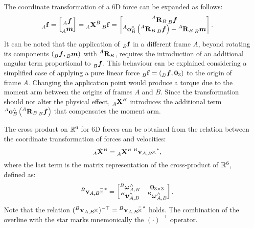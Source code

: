 \begin{remark*}
%
The coordinate transformation of a 6D force can be expanded as follows:
%
\begin{equation*}
    \forcesix[A]
    = \begin{bmatrix}
        \forcelin[A] \\ \forceang[A]
    \end{bmatrix}
    = \transfor[A]^B \forcesix[B]
    = \begin{bmatrix}
        \rot[A]_B \forcelin[B] \\
        \ori[A]_B^\wedge \left( \rot[A]_B \forcelin[B] \right) + \rot[A]_B \forceang[B]
    \end{bmatrix}
    .
\end{equation*}
%
It can be noted that the application of $\forcesix[B]$ in a different frame $A$, beyond rotating its components $(\forcelin[B], \forceang[B])$ with $\rot[A]_B$, requires the introduction of an additional angular term proportional to $\forcelin[B]$.
This behaviour can be explained considering a simplified case of applying a pure linear force $\forcesix[B] = (\forcelin[B], \zeros_3)$ to the origin of frame $A$.
Changing the application point would produce a torque due to the moment arm between the origins of frames $A$ and $B$.
Since the transformation should not alter the physical effect, $\transfor[A]^B$ introduces the additional term $\ori[A]_B^\wedge \left( \rot[A]_B \forcelin[B] \right)$ that compensates the moment arm.
%
\end{remark*}

The cross product on $\realn^6$ for 6D forces can be obtained from the relation between the coordinate transformation of forces and velocities:
%
\begin{equation*}
    {}_A \dot{\mathbf{X}}^B = \transfor[A]^B \crossforsix[{\velsix[B]_{A,B}}]
    ,
\end{equation*}
%
where the last term is the matrix representation of the cross-product of $\realn^6$, defined as:
%
\begin{equation*}
    \crossforsix[{\velsix[B]_{A,B}}] =
    \begin{bmatrix}
        \velang[B]_{A,B}^\wedge & \zeros_{3\times3} \\
        \vellin[B]_{A, B}^\wedge & \velang[B]_{A,B}^\wedge
    \end{bmatrix}
    .
\end{equation*}
%
Note that the relation $(\crossvelsix[{\velsix[B]_{A,B}}])^{-\top} = \crossforsix[{\velsix[B]_{A,B}}]$ holds.
The combination of the overline with the star marks mnemonically the $(\cdot)^{-\top}$ operator.


